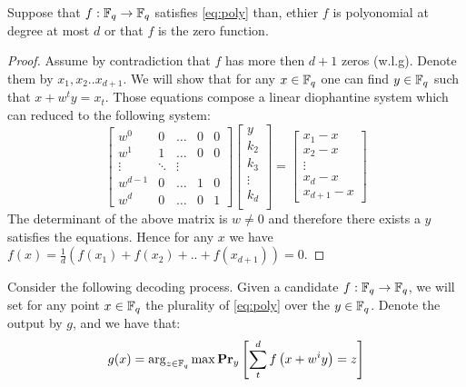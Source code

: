 \begin{claim}
  Suppose that $f : \FF \rightarrow \FF$ satisfies \cref{eq:poly} than, ethier $f$ is polyonomial at degree at most $d$ or that $f$ is the zero function.  
\end{claim}
\begin{proof}
  Assume by contradiction that $f$ has more then $d+1$ zeros (w.l.g). Denote them  by $x_{1},x_{2}.. x_{d+1}$. We will show that for any $x \in \FF $ one can find $y \in \FF$ such that $x + w^{t}y =x_{t}$. Those equations compose a linear diophantine system which can reduced to the following system: 
  \begin{equation*}  
\begin{bmatrix}
  w^{0}                     & 0 &  \dots                   &  0 &     0                 \\
                               w^{1}                & 1     &  \dots             & 0      &       0                    \\
                              \vdots                    &  \ddots               &  \vdots                    \\
                               w^{d-1}              & 0    &  \dots             &   1   &       0                    \\
                               w^{d}              & 0 & \dots       &  0     &       1
\end{bmatrix} 
\begin{bmatrix}
  y \\ 
  k_{2} \\
  k_{3} \\
  \vdots  \\
  k_{d} \\  
\end{bmatrix}
= \begin{bmatrix}
  x_{1} - x \\
  x_{2} -x \\
  \vdots \\
  x_{d} - x \\
  x_{d+1} - x
\end{bmatrix}
  \end{equation*}
  The determinant of the above matrix is $w \neq 0$ and therefore there exists a $y$ satisfies the equations. Hence for any $x$ we have $f(x) = \frac{1}{d}\left( f(x_{1}) + f(x_{2}) + .. + f(x_{d+1}) \right) = 0$.   
\end{proof}
Consider the following decoding process. Given a candidate $f : \FF \rightarrow \FF$, we will set for any point $x \in \FF$ the plurality of \cref{eq:poly} over the $y \in \FF$. Denote the output by $g$, and we have that:
\begin{equation*}
  \begin{split}
    g(x) = \arg_{z\in \FF} \max \prbm{ \sum_{t}^{d}{f\left( x + w^{i}y \right) = z }}{y}
  \end{split}
\end{equation*}

